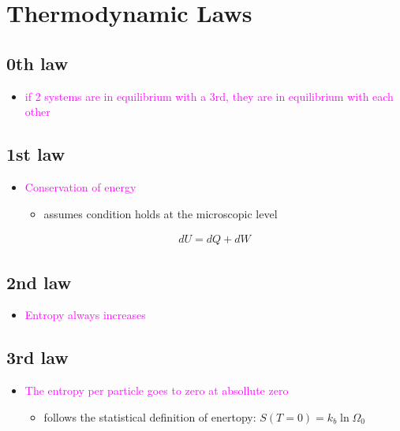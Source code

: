 

\section{Thermodynamic Laws}

\subsection{0th law}
\begin{itemize}
    \item \textcolor{magenta}{if 2 systems are in equilibrium with a 3rd, they are in equilibrium
    with each other}
\end{itemize}


\subsection{1st law}
\begin{itemize}
    \item \textcolor{magenta}{Conservation of energy}
    \begin{itemize}
        \item assumes condition holds at the microscopic level
    \end{itemize}
    \begin{align}
        dU = dQ + dW
    \end{align}
\end{itemize}


\subsection{2nd law}
\begin{itemize}
    \item \textcolor{magenta}{Entropy always increases}
\end{itemize}


\subsection{3rd law}
\begin{itemize}
    \item \textcolor{magenta}{The entropy per particle goes to zero at absollute zero}
    \begin{itemize}
        \item follows the statistical definition of enertopy: $S(T = 0) = k_b \ln \Omega_0$
    \end{itemize}
\end{itemize}
